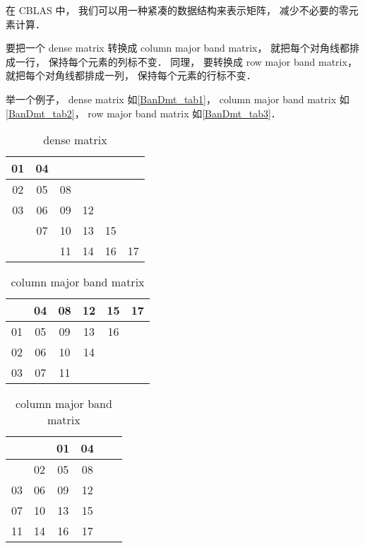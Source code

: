 
\begin{issues}
\issueDraft
\issueMissDepend
\end{issues}


在 CBLAS 中， 我们可以用一种紧凑的数据结构来表示矩阵， 减少不必要的零元素计算．

要把一个 dense matrix 转换成 column major band matrix， 就把每个对角线都排成一行， 保持每个元素的列标不变． 同理， 要转换成 row major band matrix， 就把每个对角线都排成一列， 保持每个元素的行标不变．

举一个例子， dense matrix 如\autoref{BanDmt_tab1}， column major band matrix 如\autoref{BanDmt_tab2}， row major band matrix 如\autoref{BanDmt_tab3}．

\begin{table}[ht]
\centering
\caption{dense matrix}\label{BanDmt_tab1}
\begin{tabular}{|c|c|c|c|c|c|}
\hline
01  & 04  &    &    &    &   \\
\hline
02  & 05  & 08  &    &    &   \\
\hline
03  & 06  & 09  & 12  &    &   \\
\hline
   & 07  & 10 &  13  & 15  &   \\
\hline
   &    & 11 &  14  & 16  & 17 \\
\hline
\end{tabular}
\end{table}

\begin{table}[ht]
\centering
\caption{column major band matrix}\label{BanDmt_tab2}
\begin{tabular}{|c|c|c|c|c|c|}
\hline
   & 04  & 08  & 12 &  15 &  17 \\
\hline
01  & 05  & 09  & 13 &  16 &    \\
\hline
02  & 06  & 10 & 14 &     &    \\
\hline
03  & 07  & 11 &    &     &    \\
\hline
\end{tabular}
\end{table}

\begin{table}[ht]
\centering
\caption{column major band matrix}\label{BanDmt_tab3}
\begin{tabular}{|c|c|c|c|c|c|}
\hline
   &     &  01  &  04 \\
\hline
   &  02  &  05  &  08 \\
\hline
03  &  06  &  09  &  12 \\
\hline
07  &  10 &  13 &  15 \\
\hline
11 &  14 &  16 &  17 \\
\hline
\end{tabular}
\end{table}

